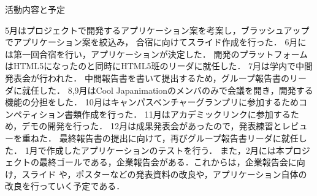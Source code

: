 \par
活動内容と予定
\par
5月はプロジェクトで開発するアプリケーション案を考案し，ブラッシュアップでアプリケーション案を絞込み，
合宿に向けてスライド作成を行った．
6月には第一回合宿を行い，アプリケーションが決定した．
開発のプラットフォームはHTML5になったのと同時にHTML5班のリーダに就任した．
7月は学内で中間発表会が行われた．
中間報告書を書いて提出するため，グループ報告書のリーダに就任した．
8,9月はCool Japanimationのメンバのみで会議を開き，開発する機能の分担をした．
10月はキャンパスベンチャーグランプリに参加するためコンペティション書類作成を行った．
11月はアカデミックリンクに参加するため，デモの開発を行った．
12月は成果発表会があったので，発表練習とレビューを重ねた．
最終報告書の提出に向けて，再びグループ報告書リーダに就任した．
1月で作成したアプリケーションのテストを行う．
また，2月には本プロジェクトの最終ゴールである，企業報告会がある．これからは，企業報告会に向け，スライド
や，ポスターなどの発表資料の改良や，アプリケーション自体の改良を行っていく予定である．
